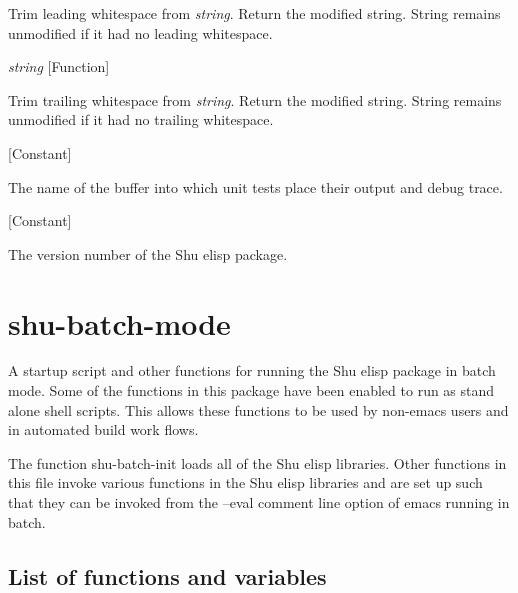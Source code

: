 \begin{doc-string}
Trim leading whitespace from \emph{string}.  Return the modified string.  String
remains unmodified if it had no leading whitespace.
\end{doc-string}

\vspace{1em}
\noindent
{}
\usebox{\funcname}\emph{string}
 \hfill [Function]

\begin{doc-string}
Trim trailing whitespace from \emph{string}.  Return the modified string.  String
remains unmodified if it had no trailing whitespace.
\end{doc-string}

\vspace{1em}
\noindent
{}
\usebox{\funcname}
 \hfill [Constant]

\begin{doc-string}
The name of the buffer into which unit tests place their output and debug trace.
\end{doc-string}

\vspace{1em}
\noindent
{}
\usebox{\funcname}
 \hfill [Constant]

\begin{doc-string}
The version number of the Shu elisp package.
\end{doc-string}

\eject
\section{shu-batch-mode}


A startup script and other functions for running the Shu elisp package
in batch mode.  Some of the functions in this package have been
enabled to run as stand alone shell scripts.  This allows these
functions to be used by non-emacs users and in automated build
work flows.

The function shu-batch-init loads all of the Shu elisp libraries.
Other functions in this file invoke various functions in the Shu
elisp libraries and are set up such that they can be invoked from
the --eval comment line option of emacs running in batch.


\subsection{List of functions and variables}

